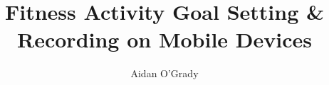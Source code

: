\documentclass[12pt, a4paper]{article}
\begin{document}
    \title{Fitness Activity Goal Setting \& Recording on Mobile Devices}
    \author{Aidan O'Grady}
    \date{}
    \maketitle
    \tableofcontents

    \newpage

    
    
    
    
    
    
    
\end{document}
